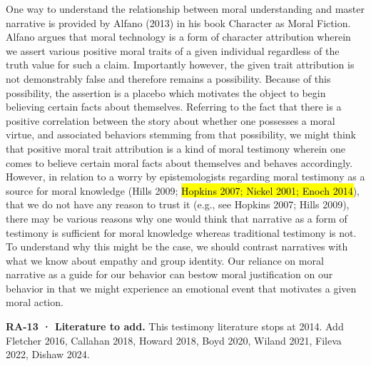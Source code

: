 \documentclass[
  letterpaper,
  DIV=11,
  numbers=noendperiod]{scrartcl}
\theoremstyle{remark}
\begin{document}
One way to understand the relationship between moral understanding and
master narrative is provided by Alfano (2013) in his book Character as
Moral Fiction. Alfano argues that moral technology is a form of
character attribution wherein we assert various positive moral traits of
a given individual regardless of the truth value for such a claim.
Importantly however, the given trait attribution is not demonstrably
false and therefore remains a possibility. Because of this possibility,
the assertion is a placebo which motivates the object to begin believing
certain facts about themselves. Referring to the fact that there is a
positive correlation between the story about whether one possesses a
moral virtue, and associated behaviors stemming from that possibility,
we might think that positive moral trait attribution is a kind of moral
testimony wherein one comes to believe certain moral facts about
themselves and behaves accordingly. However, in relation to a worry by
epistemologists regarding moral testimony as a source for moral
knowledge (Hills 2009; \hl{Hopkins 2007; Nickel 2001; Enoch 2014}), that
we do not have any reason to trust it (e.g., see Hopkins 2007; Hills
2009), there may be various reasons why one would think that narrative
as a form of testimony is sufficient for moral knowledge whereas
traditional testimony is not. To understand why this might be the case,
we should contrast narratives with what we know about empathy and group
identity. Our reliance on moral narrative as a guide for our behavior
can bestow moral justification on our behavior in that we might
experience an emotional event that motivates a given moral action.

\begin{tcolorbox}[enhanced jigsaw, arc=.35mm, bottomrule=.15mm, bottomtitle=1mm, breakable, colback=white, colbacktitle=quarto-callout-tip-color!10!white, colframe=quarto-callout-tip-color-frame, coltitle=black, left=2mm, leftrule=.75mm, opacityback=0, opacitybacktitle=0.6, rightrule=.15mm, title=\textcolor{quarto-callout-tip-color}{\faLightbulb}\hspace{0.5em}{Tip}, titlerule=0mm, toprule=.15mm, toptitle=1mm]

\textbf{RA-13 · Literature to add.} This testimony literature stops at
2014. Add Fletcher 2016, Callahan 2018, Howard 2018, Boyd 2020, Wiland
2021, Fileva 2022, Dishaw 2024.

\end{tcolorbox}
\end{document}
